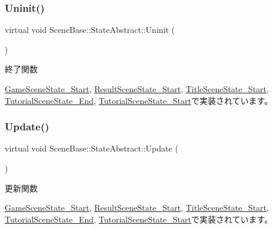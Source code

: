 \subsubsection{\texorpdfstring{Uninit()}{Uninit()}}
{\footnotesize\ttfamily virtual void Scene\+Base\+::\+State\+Abstract\+::\+Uninit (\begin{DoxyParamCaption}{ }\end{DoxyParamCaption})\hspace{0.3cm}{\ttfamily [pure virtual]}}



終了関数 



\mbox{\hyperlink{class_game_scene_state___start_a636df8b7ac0173b044b0efc2927fb83b}{Game\+Scene\+State\+\_\+\+Start}}, \mbox{\hyperlink{class_result_scene_state___start_af5b9af607074e3296481a1660607fb9a}{Result\+Scene\+State\+\_\+\+Start}}, \mbox{\hyperlink{class_title_scene_state___start_a5bcb4d7a9250ea1c0041c38616ffabfe}{Title\+Scene\+State\+\_\+\+Start}}, \mbox{\hyperlink{class_tutorial_scene_state___end_aafc0d8d042de8c7f79d84fcdc35a807c}{Tutorial\+Scene\+State\+\_\+\+End}}, \mbox{\hyperlink{class_tutorial_scene_state___start_a974962addfb0bcba90fbab64ac6d50f0}{Tutorial\+Scene\+State\+\_\+\+Start}}で実装されています。

\mbox{\label{class_scene_base_1_1_state_abstract_a7fca4c5e7d0174af8a147c404f4e6eee}} 
\subsubsection{\texorpdfstring{Update()}{Update()}}
{\footnotesize\ttfamily virtual void Scene\+Base\+::\+State\+Abstract\+::\+Update (\begin{DoxyParamCaption}{ }\end{DoxyParamCaption})\hspace{0.3cm}{\ttfamily [pure virtual]}}



更新関数 



\mbox{\hyperlink{class_game_scene_state___start_ae11bb8d8ea9eae4fea2a9acf33dd1c8b}{Game\+Scene\+State\+\_\+\+Start}}, \mbox{\hyperlink{class_result_scene_state___start_a2ecdef2bef0cd1a04055e8687e11199b}{Result\+Scene\+State\+\_\+\+Start}}, \mbox{\hyperlink{class_title_scene_state___start_a2e98cf6810711b58766d7147168d02eb}{Title\+Scene\+State\+\_\+\+Start}}, \mbox{\hyperlink{class_tutorial_scene_state___end_a7cdf03fa9a0e41ab86c2b41b8165ad09}{Tutorial\+Scene\+State\+\_\+\+End}}, \mbox{\hyperlink{class_tutorial_scene_state___start_a93c322692bf56172f383d3e5b17cd85c}{Tutorial\+Scene\+State\+\_\+\+Start}}で実装されています。

